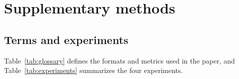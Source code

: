 \documentclass[10pt,letterpaper]{article}
\begin{document}
{\small


}

\appendix
\setcounter{table}{0}
\setcounter{figure}{0}
\renewcommand{\thetable}{A\arabic{table}}
\renewcommand{\thefigure}{A\arabic{figure}}

\section{Supplementary methods}
\label{app:methods}

\subsection{Terms and experiments}
\label{app:terms}
Table~\ref{tab:glossary} defines the formats and metrics used in the paper, and Table~\ref{tab:experiments} summarizes the four experiments.
\end{document}

